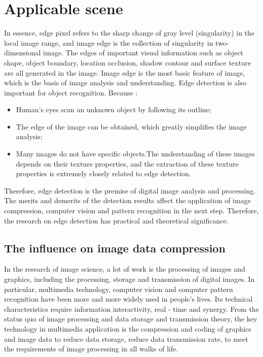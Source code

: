 \documentclass[review]{cvpr}
\begin{document}
\section{Applicable scene}

In essence, edge pixel refers to the sharp change of gray level (singularity) in the local image range, and image edge is the collection of singularity in two-dimensional image. The edges of important visual information such as object shape, object boundary, location occlusion, shadow contour and surface texture are all generated in the image. Image edge is the most basic feature of image, which is the basis of image analysis and understanding. Edge detection is also important for object recognition. Because :

\begin{itemize}
  \item Human's eyes scan an unknown object by following its outline; 
  \item The edge of the image can be obtained, which greatly simplifies the image analysis;
  \item Many images do not have specific objects.The understanding of these images depends on their texture properties, and the extraction of these texture properties is extremely closely related to edge detection. 
\end{itemize}

 Therefore, edge detection is the premise of digital image analysis and processing. The merits and demerits of the detection results affect the application of image compression, computer vision and pattern recognition in the next step. Therefore, the research on edge detection has practical and theoretical significance.

\subsection{The influence on image data compression}

In the research of image science, a lot of work is the processing of images and graphics, including the processing, storage and transmission of digital images. In particular, multimedia technology, computer vision and computer pattern recognition have been more and more widely used in people's lives. Its technical characteristics require information interactivity, real - time and synergy. From the status quo of image processing and data storage and transmission theory, the key technology in multimedia application is the compression and coding of graphics and image data to reduce data storage, reduce data transmission rate, to meet the requirements of image processing in all walks of life.
\end{document}
